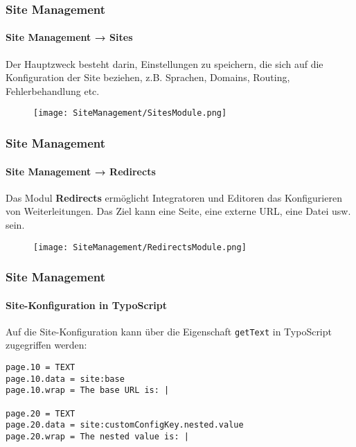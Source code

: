 
\begin{frame}[fragile]
	\frametitle{Site Management}
	\framesubtitle{Site Management → Sites}

	Der Hauptzweck besteht darin, Einstellungen zu speichern, die sich auf die 
	Konfiguration der Site beziehen, z.B. Sprachen, Domains, Routing, Fehlerbehandlung etc.

	\begin{figure}
		\texttt{[image: SiteManagement/SitesModule.png]}
	\end{figure}

\end{frame}


\begin{frame}[fragile]
	\frametitle{Site Management}
	\framesubtitle{Site Management → Redirects}

	Das Modul \textbf{Redirects} ermöglicht Integratoren und Editoren das Konfigurieren 
	von Weiterleitungen. Das Ziel kann eine Seite, eine externe URL, eine Datei usw. sein.

	\begin{figure}
		\texttt{[image: SiteManagement/RedirectsModule.png]}
	\end{figure}

\end{frame}


\begin{frame}[fragile]
	\frametitle{Site Management}
	\framesubtitle{Site-Konfiguration in TypoScript}

	\lstset{basicstyle=\smaller\ttfamily}

	Auf die Site-Konfiguration kann über die Eigenschaft \texttt{getText} in TypoScript
	zugegriffen werden:

\begin{lstlisting}
page.10 = TEXT
page.10.data = site:base
page.10.wrap = The base URL is: |

page.20 = TEXT
page.20.data = site:customConfigKey.nested.value
page.20.wrap = The nested value is: |
\end{lstlisting}

\end{frame}

